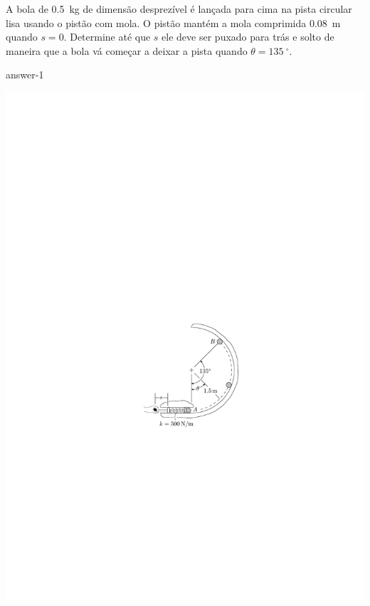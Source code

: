 
\item A bola de \SI{0.5}{\kilogram} de dimensão desprezível é lançada para cima na pista circular lisa usando o pistão com mola. O pistão mantém a mola comprimida \SI{0.08}{\meter} quando $s=0$. Determine até que $s$ ele deve ser puxado para trás e solto de maneira que a bola vá começar a deixar a pista quando $\theta=\SI{135}{^{\circ}}$.

{answer-1}

\vspace{-1.5cm}
\begin{flushright}
    \includegraphics[scale=1.2]{images/draw_1.pdf}
\end{flushright}